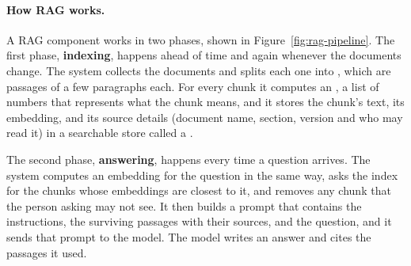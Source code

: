 \paragraph{How RAG works.} A RAG component works in two phases, shown in Figure~\ref{fig:rag-pipeline}. The first phase, \textbf{indexing}, happens ahead of time and again whenever the documents change. The system collects the documents and splits each one into , which are passages of a few paragraphs each. For every chunk it computes an , a list of numbers that represents what the chunk means, and it stores the chunk's text, its embedding, and its source details (document name, section, version and who may read it) in a searchable store called a .

The second phase, \textbf{answering}, happens every time a question arrives. The system computes an embedding for the question in the same way, asks the index for the chunks whose embeddings are closest to it, and removes any chunk that the person asking may not see. It then builds a prompt that contains the instructions, the surviving passages with their sources, and the question, and it sends that prompt to the model. The model writes an answer and cites the passages it used.


